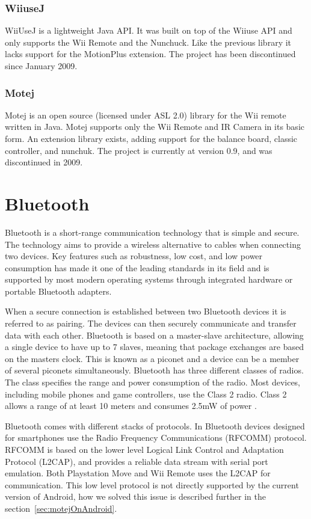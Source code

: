 \subsubsection{WiiuseJ}
WiiUseJ is a lightweight Java API. It was built on top of the Wiiuse API and only supports the Wii Remote and the Nunchuck. Like the previous library it lacks support for the MotionPlus extension. The project has been discontinued since January 2009. \cite{Wiiusej}

\subsubsection{Motej}
Motej is an open source (licensed under ASL 2.0) library for the Wii remote written in Java. Motej supports only the Wii Remote and IR Camera in its basic form. An extension library exists, adding support for the balance board, classic controller, and nunchuk. The project is currently at version 0.9, and was discontinued in 2009. \cite{Motej}

\section{Bluetooth}
Bluetooth is a short-range communication technology that is simple and secure. The technology aims to provide a wireless alternative to cables when connecting two devices. Key features such as robustness, low cost, and low power consumption has made it one of the leading standards in its field and is supported by most modern operating systems through integrated hardware or portable Bluetooth adapters.

When a secure connection is established between two Bluetooth devices it is referred to as pairing. The devices can then securely communicate and transfer data with each other. Bluetooth is based on a master-slave architecture, allowing a single device to have up to 7 slaves, meaning that package exchanges are based on the masters clock. This is known as a piconet and a device can be a member of several piconets simultaneously. Bluetooth has three different classes of radios. The class specifies the range and power consumption of the radio. Most devices, including mobile phones and game controllers, use the Class 2 radio. Class 2 allows a range of at least 10 meters and consumes 2.5mW of power \cite{bluetooth}.

Bluetooth comes with different stacks of protocols. In Bluetooth devices designed for smartphones use the Radio Frequency Communications (RFCOMM) protocol. RFCOMM is based on the lower level Logical Link Control and Adaptation Protocol (L2CAP), and provides a reliable data stream with serial port emulation. Both Playstation Move and Wii Remote uses the L2CAP for communication. This low level protocol is not directly supported by the current version of Android, how we solved this issue is described further in the section~\ref{sec:motejOnAndroid}.